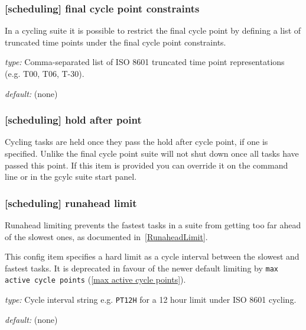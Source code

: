 \subsubsection[final cycle point constraints]{[scheduling] \textrightarrow final cycle point constraints}
\label{final cycle point constraints}

In a cycling suite it is possible to restrict the final cycle point by
defining a list of truncated time points under the final cycle point 
constraints.

\begin{myitemize}
    \item {\em type:} Comma-separated list of ISO 8601 truncated time point
        representations (e.g. T00, T06, T-30).
    \item {\em default:} (none)
\end{myitemize}

\subsubsection[hold after point]{[scheduling] \textrightarrow hold after point}

Cycling tasks are held once they pass the hold after cycle point, if one is
specified. Unlike the final cycle point suite will not shut down once all tasks
have passed this point. If this item is provided you can override it on the 
command line or in the gcylc suite start panel.

\subsubsection[runahead limit]{[scheduling] \textrightarrow runahead limit}
\label{runahead limit}

Runahead limiting prevents the fastest tasks in a suite from getting too far
ahead of the slowest ones, as documented in~\ref{RunaheadLimit}.

This config item specifies a hard limit as a cycle interval between the
slowest and fastest tasks. It is deprecated in favour of the newer default 
limiting by \lstinline=max active cycle points= (\ref{max active cycle points}).

\begin{myitemize}
    \item {\em type:} Cycle interval string e.g. \lstinline=PT12H=
    for a 12 hour limit under ISO 8601 cycling.
    \item {\em default:} (none)
\end{myitemize}

